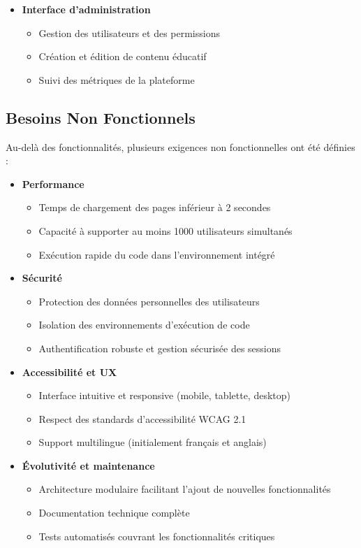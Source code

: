 \begin{itemize}
  \item \textbf{Interface d'administration}
    \begin{itemize}
      \item Gestion des utilisateurs et des permissions
      \item Création et édition de contenu éducatif
      \item Suivi des métriques de la plateforme
    \end{itemize}
\end{itemize}

\subsection{Besoins Non Fonctionnels}
Au-delà des fonctionnalités, plusieurs exigences non fonctionnelles ont été définies :

\begin{itemize}
  \item \textbf{Performance}
    \begin{itemize}
      \item Temps de chargement des pages inférieur à 2 secondes
      \item Capacité à supporter au moins 1000 utilisateurs simultanés
      \item Exécution rapide du code dans l'environnement intégré
    \end{itemize}
  
  \item \textbf{Sécurité}
    \begin{itemize}
      \item Protection des données personnelles des utilisateurs
      \item Isolation des environnements d'exécution de code
      \item Authentification robuste et gestion sécurisée des sessions
    \end{itemize}
  
  \item \textbf{Accessibilité et UX}
    \begin{itemize}
      \item Interface intuitive et responsive (mobile, tablette, desktop)
      \item Respect des standards d'accessibilité WCAG 2.1
      \item Support multilingue (initialement français et anglais)
    \end{itemize}
  
  \item \textbf{Évolutivité et maintenance}
    \begin{itemize}
      \item Architecture modulaire facilitant l'ajout de nouvelles fonctionnalités
      \item Documentation technique complète
      \item Tests automatisés couvrant les fonctionnalités critiques
    \end{itemize}
\end{itemize}

